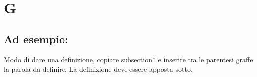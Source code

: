 \section*{G}
\markright{}
\subsection*{Ad esempio:}
Modo di dare una definizione, copiare subsection*{} e inserire tra le parentesi graffe la parola da definire. La definizione deve essere apposta sotto.